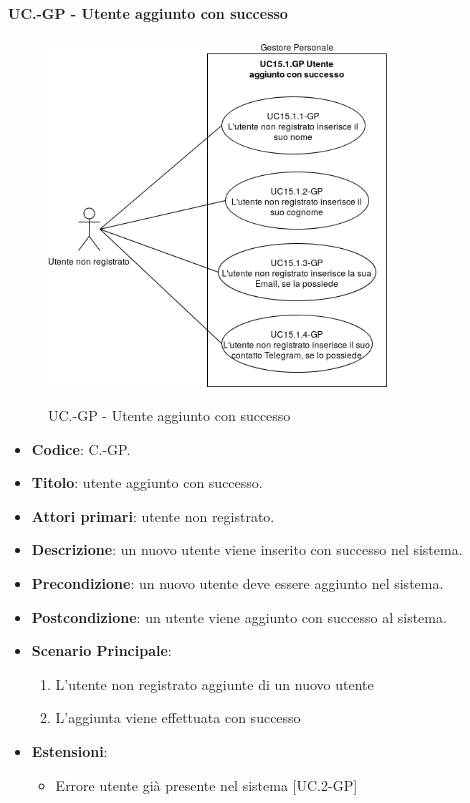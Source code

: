 	\paragraph{UC\theuccount.\thesubuccount-GP - Utente aggiunto con successo}
		\begin{figure}[H]
			\centering
			\includegraphics[width=0.8\textwidth]{img/casi_d'uso/UC15_1.png}\\
			\caption{UC\theuccount.\thesubuccount-GP - Utente aggiunto con successo}
		\end{figure}
		\begin{itemize}
			\item \textbf{Codice}: C\theuccount.\thesubuccount-GP.
			\item \textbf{Titolo}: utente aggiunto con successo.
			\item \textbf{Attori primari}: utente non registrato.
			\item \textbf{Descrizione}: un nuovo utente viene inserito con successo nel sistema.
			\item \textbf{Precondizione}: un nuovo utente deve essere aggiunto nel sistema.
			\item \textbf{Postcondizione}: un utente viene aggiunto con successo al sistema.
			\item \textbf{Scenario Principale}:
			\begin{enumerate}
				\item L'utente non registrato aggiunte di un nuovo utente
				\item L'aggiunta viene effettuata con successo
			\end{enumerate}
			\item \textbf{Estensioni}:
			\begin{itemize}
				\item Errore utente già presente nel sistema [UC\theuccount.2-GP]
			\end{itemize}
		\end{itemize}
		
